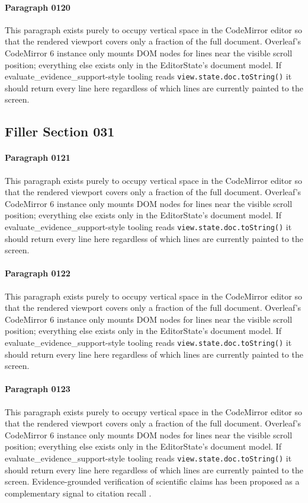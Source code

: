 \documentclass{article}
\begin{document}
\paragraph{Paragraph 0120}
This paragraph exists purely to occupy vertical space in the CodeMirror editor so that the rendered viewport covers only a fraction of the full document. Overleaf's CodeMirror 6 instance only mounts DOM nodes for lines near the visible scroll position; everything else exists only in the EditorState's document model. If evaluate\_evidence\_support-style tooling reads \texttt{view.state.doc.toString()} it should return every line here regardless of which lines are currently painted to the screen.

\subsection{Filler Section 031}
\paragraph{Paragraph 0121}
This paragraph exists purely to occupy vertical space in the CodeMirror editor so that the rendered viewport covers only a fraction of the full document. Overleaf's CodeMirror 6 instance only mounts DOM nodes for lines near the visible scroll position; everything else exists only in the EditorState's document model. If evaluate\_evidence\_support-style tooling reads \texttt{view.state.doc.toString()} it should return every line here regardless of which lines are currently painted to the screen.

\paragraph{Paragraph 0122}
This paragraph exists purely to occupy vertical space in the CodeMirror editor so that the rendered viewport covers only a fraction of the full document. Overleaf's CodeMirror 6 instance only mounts DOM nodes for lines near the visible scroll position; everything else exists only in the EditorState's document model. If evaluate\_evidence\_support-style tooling reads \texttt{view.state.doc.toString()} it should return every line here regardless of which lines are currently painted to the screen.

\paragraph{Paragraph 0123}
This paragraph exists purely to occupy vertical space in the CodeMirror editor so that the rendered viewport covers only a fraction of the full document. Overleaf's CodeMirror 6 instance only mounts DOM nodes for lines near the visible scroll position; everything else exists only in the EditorState's document model. If evaluate\_evidence\_support-style tooling reads \texttt{view.state.doc.toString()} it should return every line here regardless of which lines are currently painted to the screen. Evidence-grounded verification of scientific claims has been proposed as a complementary signal to citation recall \citep{yamamoto2020evidence}.
\end{document}
